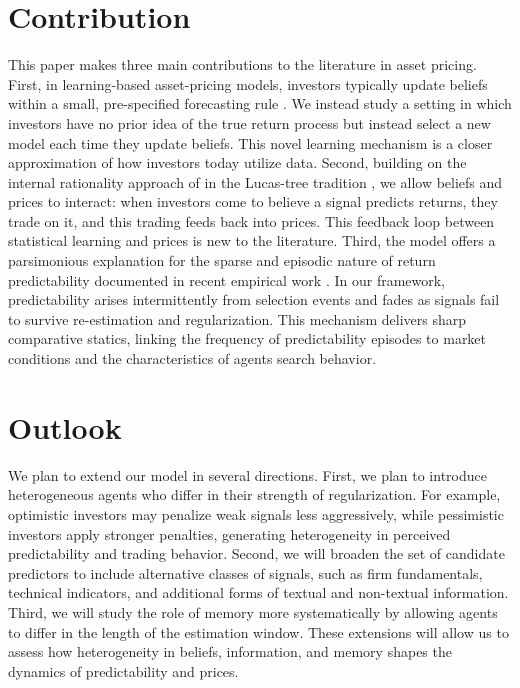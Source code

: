 \documentclass[11pt]{article}
\begin{document}
\section*{Contribution}

This paper makes three main contributions to the literature in asset pricing.
First, in learning-based asset-pricing models, investors typically update beliefs within a small, pre-specified forecasting rule \citep{Marcet1989,Timmermann1993,barberis1998model,hong2007simple}.
We instead study a setting in which investors have no prior idea of the true return process but instead select a new model each time they update beliefs. 
This novel learning mechanism is a closer approximation of how investors today utilize data.
Second, building on the internal rationality approach of \cite{Adam2016} in the Lucas-tree tradition \citep{Lucas1978}, we allow beliefs and prices to interact: when investors come to believe a signal predicts returns, they trade on it, and this trading feeds back into prices.
This feedback loop between statistical learning and prices is new to the literature.
Third, the model offers a parsimonious explanation for the sparse and episodic nature of return predictability documented in recent empirical work \citep{Chinco2019,Farmer2023}.
In our framework, predictability arises intermittently from selection events and fades as signals fail to survive re-estimation and regularization. 
This mechanism delivers sharp comparative statics, linking the frequency of predictability episodes to market conditions and the characteristics of agents search behavior.

\section*{Outlook}

We plan to extend our model in several directions.
First, we plan to introduce heterogeneous agents who differ in their strength of regularization.
For example, optimistic investors may penalize weak signals less aggressively, while pessimistic investors apply stronger penalties, generating heterogeneity in perceived predictability and trading behavior.
Second, we will broaden the set of candidate predictors to include alternative classes of signals, such as firm fundamentals, technical indicators, and additional forms of textual and non-textual information.
Third, we will study the role of memory more systematically by allowing agents to differ in the length of the estimation window.
These extensions will allow us to assess how heterogeneity in beliefs, information, and memory shapes the dynamics of predictability and prices.

\newpage


\end{document}

